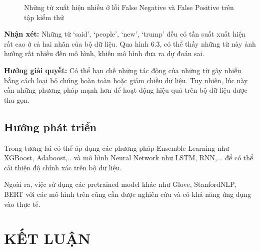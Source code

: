 \documentclass[12pt,a4paper,oneside]{book}
\begin{document}
\begin{figure}[H]
	\hfill
	\caption{Những từ xuất hiện nhiều ở lỗi False Negative và False Positive trên tập kiểm thử} 
\end{figure}

\textbf{Nhận xét:} Những từ `said', `people', `new', `trump' đều có tần suất xuất hiện rất cao ở cả hai nhãn của bộ dữ liệu. Qua hình 6.3, có thể thấy những từ này ảnh hưởng rất nhiều đến mô hình, khiến mô hình đưa ra dự đoán sai.

\textbf{Hướng giải quyết:} Có thể hạn chế những tác động của những từ gây nhiễu bằng cách loại bỏ chúng hoàn toàn hoặc giảm chiều dữ liệu. Tuy nhiên, lúc này cần những phương pháp mạnh hơn để hoạt động hiệu quả trên bộ dữ liệu được thu gọn.

\section{Hướng phát triển}
Trong tương lai có thể áp dụng các phương pháp Ensemble Learning như XGBoost, Adaboost,.. và mô hình Neural Network như LSTM, RNN,... để có thể cải thiện độ chính xác trên bộ dữ liệu.

Ngoài ra, việc sử dụng các pretrained model khác như Glove, StanfordNLP, BERT với các mô hình trên cũng cần được nghiên cứu và có khả năng ứng dụng vào thực tế.

\chapter*{KẾT LUẬN}
\end{document}
